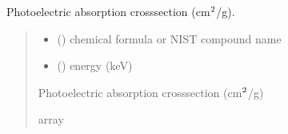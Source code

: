 \documentclass[letterpaper,10pt,english,openany,oneside]{sphinxmanual}
\begin{document}
\begin{fulllineitems}
\label{\detokenize{api/cross_sections:dxraylib.CS_Photo_CP}}
\pysigstartsignatures
{}
\pysigstopsignatures
\sphinxAtStartPar
Photoelectric absorption cross\sphinxhyphen{}section (cm\(\sp{\text{2}}\)/g).
\begin{quote}\begin{description}
\begin{itemize}
\item {} 
\sphinxAtStartPar
{} () \textendash{} chemical formula or NIST compound name

\item {} 
\sphinxAtStartPar
{} () \textendash{} energy (keV)

\end{itemize}

\sphinxAtStartPar
Photoelectric absorption cross\sphinxhyphen{}section (cm\(\sp{\text{2}}\)/g)

\sphinxAtStartPar
array

\end{description}\end{quote}

\end{fulllineitems}


\begin{DUlineblock}{0em}
\item[] 
\end{DUlineblock}
\end{document}
